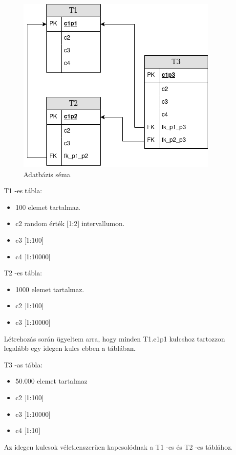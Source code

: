 \begin{figure}[h!]
\centering
\includegraphics[width=\textwidth]{images/new_schema.png}
\caption{Adatbázis séma}
\label{fig:schema}
\end{figure}

T1 -es tábla:
\begin{itemize}
\item 100 elemet tartalmaz.
\item c2    random érték [1:2] intervallumon.
\item c3    [1:100]
\item c4    [1:10000]
\end{itemize}
T2 -es tábla:
\begin{itemize}
\item 1000 elemet tartalmaz.
\item c2    [1:100]
\item c3    [1:10000]
\end{itemize}
Létrehozás során ügyeltem arra, hogy minden T1.c1p1 kulcshoz tartozzon legalább egy idegen kulcs ebben a táblában.

T3 -as tábla:
\begin{itemize}   
\item 50.000 elemet tartalmaz
\item c2    [1:100]
\item c3    [1:10000]
\item c4    [1:10]
\end{itemize}
Az idegen kulcsok véletlenszerűen kapcsolódnak a T1 -es és T2 -es táblához.


